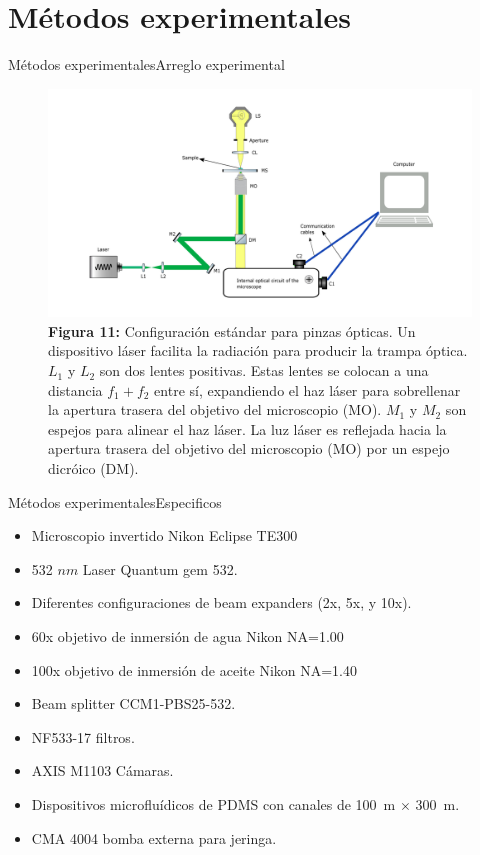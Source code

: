 \documentclass[10pt,aspectratio=1610,compress,dvipsnames]{beamer}
\begin{document}
\section{Métodos experimentales}
\begin{frame}{Métodos experimentales}{Arreglo experimental}

\begin{figure}
    \centering
    \includegraphics[scale=0.27]{Newplots_microfluidics_results/setup3.png}
    \captionsetup{labelformat = empty}
    \caption{\textbf{Figura 11:} Configuración estándar para pinzas ópticas. Un dispositivo láser facilita la radiación para producir la trampa óptica. $L_1$ y $L_2$ son dos lentes positivas. Estas lentes se colocan a una distancia $f_1 + f_2$ entre sí, expandiendo el haz láser para sobrellenar la apertura trasera del objetivo del microscopio (MO). $M_1$ y $M_2$ son espejos para alinear el haz láser. La luz láser es reflejada hacia la apertura trasera del objetivo del microscopio (MO) por un espejo dicróico (DM).}
    \label{setuptweezers}
\end{figure}

\end{frame}


\begin{frame}{Métodos experimentales}{Especificos}
\begin{itemize}
	\item Microscopio invertido Nikon Eclipse TE300
	\item 532 $nm$ Laser Quantum gem 532.
	\item Diferentes configuraciones de beam expanders (2x, 5x, y 10x).
	\item 60x objetivo de inmersi\'on de agua Nikon NA=1.00
	\item 100x objetivo de inmersi\'on de aceite Nikon NA=1.40
	\item Beam splitter CCM1-PBS25-532.
	\item NF533-17 filtros.
	\item AXIS M1103 C\'amaras.
	\item {Dispositivos microflu\'idicos de PDMS con canales de 100~\textmu m $\times$ 300~\textmu m.}
	\item CMA 4004 bomba externa para jeringa.
	

\end{itemize}
\end{frame}
\end{document}
